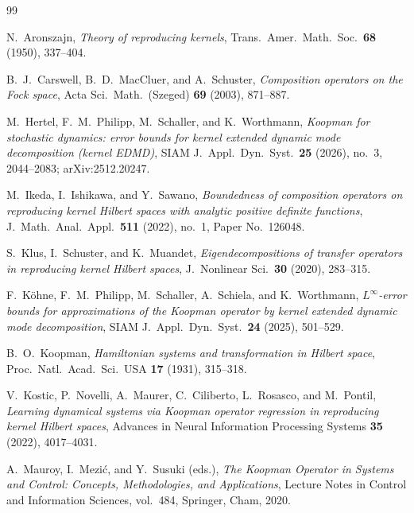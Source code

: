 \documentclass[11pt]{amsart}
\begin{document}
\begin{thebibliography}{99}
\raggedright

N.~Aronszajn, \emph{Theory of reproducing kernels}, Trans.\ Amer.\ Math.\ Soc.\ \textbf{68} (1950), 337--404.

B.~J.~Carswell, B.~D.~MacCluer, and A.~Schuster, \emph{Composition operators on the Fock space}, Acta Sci.\ Math.\
(Szeged) \textbf{69} (2003), 871--887.

M.~Hertel, F.~M.~Philipp, M.~Schaller, and K.~Worthmann, \emph{Koopman for stochastic dynamics: error bounds for kernel
extended dynamic mode decomposition (kernel EDMD)}, SIAM J.\ Appl.\ Dyn.\ Syst.\ \textbf{25} (2026), no.~3, 2044--2083;
arXiv:2512.20247.

M.~Ikeda, I.~Ishikawa, and Y.~Sawano, \emph{Boundedness of composition operators on reproducing kernel Hilbert spaces
with analytic positive definite functions}, J.\ Math.\ Anal.\ Appl.\ \textbf{511} (2022), no.~1, Paper No.~126048.

S.~Klus, I.~Schuster, and K.~Muandet, \emph{Eigendecompositions of transfer operators in reproducing kernel Hilbert
spaces}, J.\ Nonlinear Sci.\ \textbf{30} (2020), 283--315.

F.~K\"ohne, F.~M.~Philipp, M.~Schaller, A.~Schiela, and K.~Worthmann, \emph{$L^\infty$-error bounds for approximations
of the Koopman operator by kernel extended dynamic mode decomposition}, SIAM J.\ Appl.\ Dyn.\ Syst.\ \textbf{24} (2025),
501--529.

B.~O.~Koopman, \emph{Hamiltonian systems and transformation in Hilbert space}, Proc.\ Natl.\ Acad.\ Sci.\ USA
\textbf{17} (1931), 315--318.

V.~Kostic, P.~Novelli, A.~Maurer, C.~Ciliberto, L.~Rosasco, and M.~Pontil, \emph{Learning dynamical systems via Koopman
operator regression in reproducing kernel Hilbert spaces}, Advances in Neural Information Processing Systems
\textbf{35} (2022), 4017--4031.

A.~Mauroy, I.~Mezi\'c, and Y.~Susuki (eds.), \emph{The Koopman Operator in Systems and Control: Concepts,
Methodologies, and Applications}, Lecture Notes in Control and Information Sciences, vol.~484, Springer, Cham, 2020.


\end{thebibliography}
\end{document}

